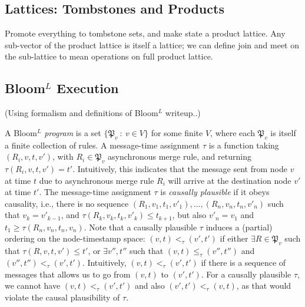 \documentclass{article}
\numberwithin{equation}{section}
\begin{document}
\subsection{Lattices: Tombstones and Products}
Promote everything to tombstone sets, and make state a product lattice.
Any sub-vector of the product lattice is itself a lattice; we can define join and meet on the sub-lattice to mean operations on full product lattice.

\subsection{Bloom$^L$ Execution}
(Using formalism and definitions of Bloom$^L$ writeup..)

A Bloom$^L$ \emph{program} is a set $\{\mathfrak{P}_v ~:~ v \in V\}$ for some finite $V$, where each $\mathfrak{P}_v$ is itself a finite collection of rules.
A message-time assignment $\tau$ is a function taking $(R_i, v, t, v')$, with $R_i \in \mathfrak{P}_v$ asynchronous merge rule, and returning $\tau(R_i, v, t, v') = t'$.
Intuitively, this indicates that the message sent from node $v$ at time $t$ due to asynchronous merge rule $R_i$ will arrive at the destination node $v'$ at time $t'$.
The message-time assignment $\tau$ is \emph{causally plausible} if it obeys causality, i.e., there is no sequence $(R_1, v_1, t_1, v'_1), \dots, (R_n, v_n, t_n, v'_n)$ such that $v_k = v'_{k-1}$, and $\tau(R_k, v_k, t_k, v'_k) \leq t_{k+1}$, but also $v'_n = v_1$ and $t_1 \geq \tau(R_n, v_n, t_n, v_n)$.
Note that a causally plausible $\tau$ induces a (partial) ordering on the node-timestamp space: $(v,t) <_\tau (v',t')$ if either $\exists R \in \mathfrak{P}_v$ such that $\tau(R,v,t,v') \leq t'$, or $\exists v'', t''$ such that $(v,t) \leq_\tau (v'', t'')$ and $(v'', t'') <_\tau (v',t')$.
Intuitively, $(v,t) <_\tau (v',t')$ if there is a sequence of messages that allows us to go from $(v,t)$ to $(v',t')$.
For a causally plausible $\tau$, we cannot have $(v,t) <_\tau (v',t')$ and also $(v',t') <_\tau (v,t)$, as that would violate the causal plausibility of $\tau$.
\end{document}
